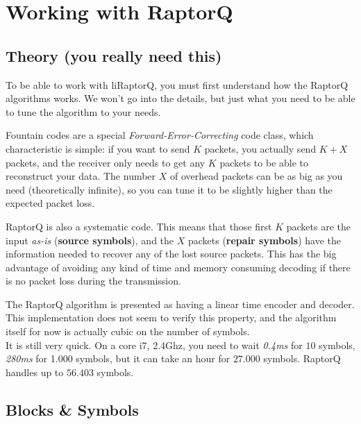 \documentclass[11pt,a4paper]{refart}
\begin{document}

\section{Working with RaptorQ}
\subsection{Theory (you really need this)}

To be able to work with liRaptorQ, you must first understand how the RaptorQ algorithms works. We won't go into the details, but just what you need
to be able to tune the algorithm to your needs.


Fountain codes are a special \textit{Forward-Error-Correcting} code class, which characteristic is simple: if you want to send $K$ packets, you actually
send $K+X$ packets, and the receiver only needs to get any $K$ packets to be able to reconstruct your data. The number $X$ of overhead packets can be as big
as you need (theoretically infinite), so you can tune it to be slightly higher than the expected packet loss.

 RaptorQ is also a systematic code. This means that those first $K$ packets are the input \textit{as-is} (\textbf{source symbols}), and the $X$ packets (\textbf{repair symbols}) have the information needed to recover any of the lost source packets. This has the big advantage of
avoiding any kind of time and memory consuming decoding if there is no packet loss during the transmission.

 The RaptorQ algorithm is presented as having a linear time encoder and decoder. This implementation does not seem to verify
this property, and the algorithm itself for now is actually cubic on the number of symbols.\\
It is still very quick. On a core i7, 2.4Ghz, you need to wait \textit{0.4ms} for $10$ symbols, \textit{280ms} for 1.000 symbols, but it can take an hour for $27.000$ symbols.
RaptorQ handles up to $56.403$ symbols.

\subsection{Blocks \& Symbols}
\end{document}
